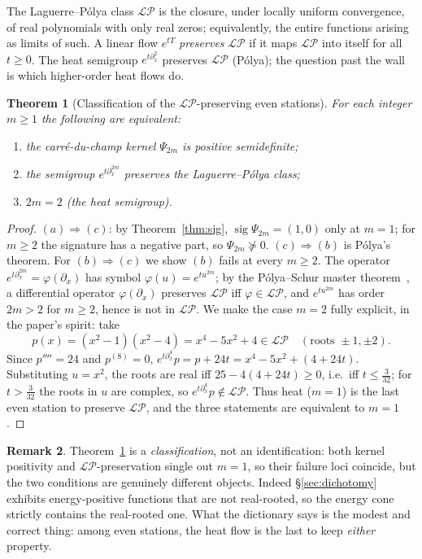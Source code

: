 \documentclass[11pt,reqno]{amsart}
\theoremstyle{plain}
\newtheorem{theorem}{Theorem}[section]
\theoremstyle{definition}
\newtheorem{remark}[theorem]{Remark}
\newcommand{\LP}{\mathcal{LP}}
\DeclareMathOperator{\sig}{sig}
\begin{document}
The Laguerre--P\'olya class $\LP$ is the closure, under locally uniform
convergence, of real polynomials with only real zeros; equivalently, the entire
functions arising as limits of such. A linear flow $e^{tT}$ \emph{preserves}
$\LP$ if it maps $\LP$ into itself for all $t\ge0$. The heat semigroup
$e^{t\partial_x^2}$ preserves $\LP$ (P\'olya); the question past the wall is which
higher-order heat flows do.

\begin{theorem}[Classification of the $\LP$-preserving even stations]\label{thm:dict}
For each integer $m\ge1$ the following are equivalent:
\begin{enumerate}[label=\textup{(\alph*)},leftmargin=2.2em]
\item the carr\'e-du-champ kernel $\Psi_{2m}$ is positive semidefinite;
\item the semigroup $e^{t\partial_x^{2m}}$ preserves the Laguerre--P\'olya class;
\item $2m=2$ (the heat semigroup).
\end{enumerate}
\end{theorem}

\begin{proof}
$(a)\Rightarrow(c)$: by Theorem~\ref{thm:sig}, $\sig\Psi_{2m}=(1,0)$ only at $m=1$;
for $m\ge2$ the signature has a negative part, so $\Psi_{2m}\not\succeq0$.
$(c)\Rightarrow(b)$ is P\'olya's theorem. For $(b)\Rightarrow(c)$ we show $(b)$
fails at every $m\ge2$. The operator $e^{t\partial_x^{2m}}=\varphi(\partial_x)$
has symbol $\varphi(u)=e^{tu^{2m}}$; by the P\'olya--Schur master
theorem~\cite{BorceaBranden}, a differential operator $\varphi(\partial_x)$
preserves $\LP$ iff $\varphi\in\LP$, and $e^{tu^{2m}}$ has order $2m>2$ for
$m\ge2$, hence is not in $\LP$. We make the case $m=2$ fully explicit, in the
paper's spirit: take
\[
  p(x)=(x^2-1)(x^2-4)=x^4-5x^2+4\in\LP\quad(\text{roots }\pm1,\pm2).
\]
Since $p''''=24$ and $p^{(8)}=0$, $e^{t\partial_x^4}p=p+24t=x^4-5x^2+(4+24t)$.
Substituting $u=x^2$, the roots are real iff $25-4(4+24t)\ge0$, i.e.\ iff
$t\le\tfrac{3}{32}$; for $t>\tfrac3{32}$ the roots in $u$ are complex, so
$e^{t\partial_x^4}p\notin\LP$. Thus heat ($m=1$) is the last even station to
preserve $\LP$, and the three statements are equivalent to $m=1$.
\end{proof}

\begin{remark}
Theorem~\ref{thm:dict} is a \emph{classification}, not an identification: both
kernel positivity and $\LP$-preservation single out $m=1$, so their failure loci
coincide, but the two conditions are genuinely different objects. Indeed
\S\ref{sec:dichotomy} exhibits energy-positive functions that are not real-rooted,
so the energy cone strictly contains the real-rooted one. What the dictionary says
is the modest and correct thing: among even stations, the heat flow is the last to
keep \emph{either} property.
\end{remark}
\end{document}
